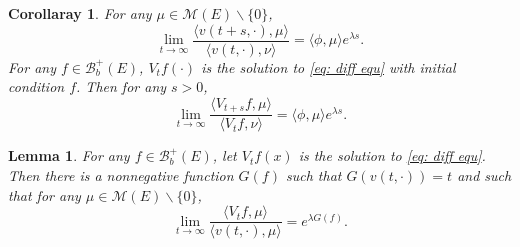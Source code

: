 \documentclass[12pt,a4paper]{amsart}
\theoremstyle{plain}
\newtheorem{lem}[thm]{Lemma}
\newtheorem{cor}[thm]{Corollaray}
\theoremstyle{definition}
\numberwithin{equation}{section}
\begin{document}
\begin{cor}\label{general rate}
	For any $\mu\in\mathcal M(E)\backslash\{0\}$,
\begin{equation}\label{ext con}
	\lim_{t\rightarrow\infty}\frac{\langle v(t+s,\cdot),\mu\rangle }{\langle v(t,\cdot),\nu\rangle }=\langle \phi,\mu\rangle e^{\lambda s}.
\end{equation}
	For any $f\in\mathcal B_b^+(E)$, $V_tf(\cdot)$ is the solution to \eqref{eq: diff equ} with initial condition $f$. Then for any $s>0$,
\begin{equation}\label{ratio limits}
	\lim_{t\rightarrow\infty}\frac{\langle V_{t+s}f,\mu\rangle }{\langle V_{t}f,\nu\rangle }=\langle \phi,\mu\rangle e^{\lambda s}.
\end{equation}
\end{cor}

\begin{lem}\label{ratio limits 2}
	For any $f\in\mathcal B_b^+(E)$, let $V_tf(x)$ is the solution to \eqref{eq: diff equ}.  Then there is a nonnegative function $G(f)$ such that $G(v(t,\cdot))=t$ and such that for any $\mu\in\mathcal M(E)\backslash\{0\}$,
\begin{equation}\label{App of G}
	\lim_{t\rightarrow\infty}\frac{\langle V_tf,\mu\rangle }{\langle v(t,\cdot),\mu\rangle }=e^{\lambda G(f)}.
\end{equation}
\end{lem}
\end{document}

